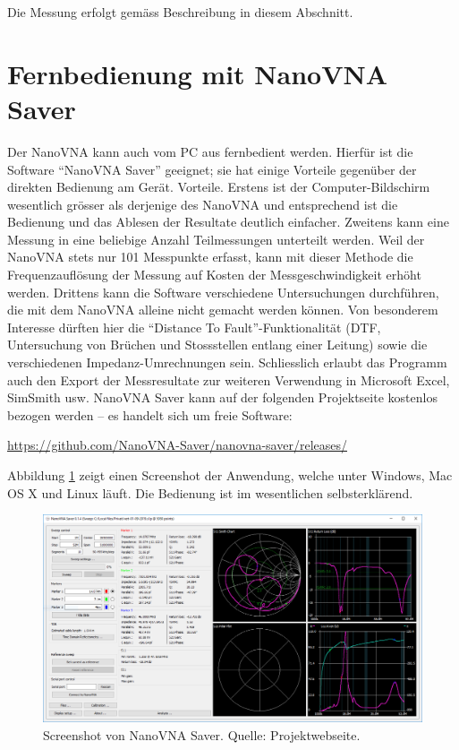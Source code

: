 \documentclass[twoside,a4paper,11pt,halfparskip,DIV=11,notitlepage]{scrartcl}
\begin{document}
Die Messung erfolgt gemäss Beschreibung in diesem Abschnitt.

\section{Fernbedienung mit NanoVNA Saver}\label{sec:nanovnasaver}
Der NanoVNA kann auch vom PC aus fernbedient werden. Hierfür ist die Software
``NanoVNA Saver'' geeignet; sie hat einige Vorteile gegenüber der direkten
Bedienung am Gerät.  Vorteile. Erstens ist der Computer-Bildschirm wesentlich
grösser als derjenige des NanoVNA und entsprechend ist die Bedienung und das
Ablesen der Resultate deutlich einfacher. Zweitens kann eine Messung in eine
beliebige Anzahl Teilmessungen unterteilt werden. Weil der NanoVNA stets nur
101 Messpunkte erfasst, kann mit dieser Methode die Frequenzauflösung der
Messung auf Kosten der Messgeschwindigkeit erhöht werden. Drittens kann die
Software verschiedene Untersuchungen durchführen, die mit dem NanoVNA alleine
nicht gemacht werden können. Von besonderem Interesse dürften hier die
``Distance To Fault''-Funktionalität (DTF, Untersuchung von Brüchen und
Stossstellen entlang einer Leitung) sowie die verschiedenen
Impedanz-Umrechnungen sein. Schliesslich erlaubt das Programm auch den Export
der Messresultate zur weiteren Verwendung in Microsoft Excel, SimSmith usw.
NanoVNA Saver kann auf der folgenden Projektseite kostenlos bezogen werden --
es handelt sich um freie Software:

\begin{center}
    \url{https://github.com/NanoVNA-Saver/nanovna-saver/releases/}
\end{center}

Abbildung \ref{fig:nanovnasaver} zeigt einen Screenshot der Anwendung, welche unter
Windows, Mac OS X und Linux läuft. Die Bedienung ist im wesentlichen
selbsterklärend.

\begin{figure}[H]
    \includegraphics[width=\textwidth]{figures/nanovnasaver.png}
    \caption{Screenshot von NanoVNA Saver. Quelle: Projektwebseite.}
    \label{fig:nanovnasaver}
\end{figure}
\end{document}
